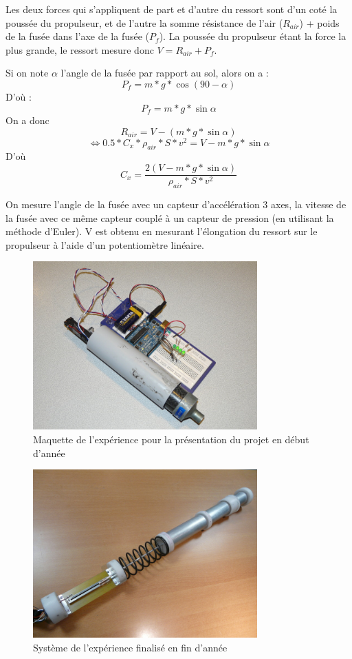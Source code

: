 \documentclass[a4paper,12pt]{scrartcl}
\begin{document}
		Les deux forces qui s'appliquent de part et d'autre du ressort sont d'un coté la poussée du propulseur, et de l'autre la somme résistance de l'air ($R_{air}$) + poids de la fusée dans l'axe de la fusée ($P_f$).
		La poussée du propulseur étant la force la plus grande, le ressort mesure donc $V = R_{air} + P_f$.
		
		Si on note $\alpha$ l'angle de la fusée par rapport au sol, alors on a : 
		  $$ P_f = m * g * \cos{(90-\alpha)}$$
		D'où : 
		  $$ P_f =  m * g * \sin{\alpha}$$		
		On a donc 
		  $$ R_{air} = V - ( m * g * \sin{\alpha})$$
		  $$ \Leftrightarrow 0.5 * C_x * \rho_{air} * S * v^2 = V - m * g * \sin{\alpha} $$
		D'où
		  $$ C_x = \frac{2(V - m * g * \sin{\alpha})}{\rho_{air} * S * v^2} $$
		
		On mesure l'angle de la fusée avec un capteur d'accélération 3 axes, la vitesse de la fusée avec ce même capteur couplé à un capteur de pression (en utilisant la méthode d'Euler).
		V est obtenu en mesurant l'élongation du ressort sur le propulseur à l'aide d'un potentiomètre linéaire.
		\begin{figure}[H]
		    \begin{center}
			\caption{ Maquette de l'expérience pour la présentation du projet en début d'année}
			\includegraphics[height=244px, width=326px]{Photos_Mercury/maquette_systeme_ressort.jpg}
		     \end{center}
		\end{figure}
		\begin{figure}[H]
		    \begin{center}
			\caption{ Système de l'expérience finalisé en fin d'année }
			\includegraphics[height=244px, width=326px]{Photos_Mercury/systemeressort.jpg}
		     \end{center}
		\end{figure}
\end{document}
